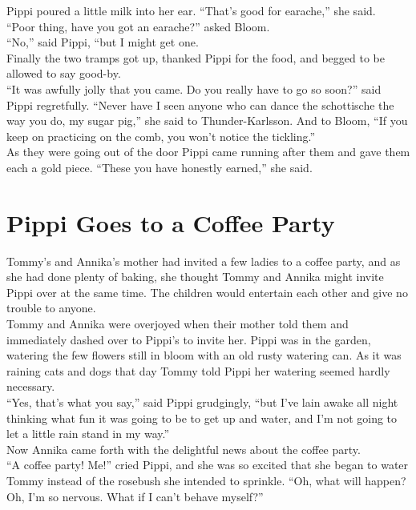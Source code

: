 \documentclass{standard}
\begin{document}
Pippi poured a little milk into her ear. “That’s good for earache,” she said.\\

“Poor thing, have you got an earache?” asked Bloom.\\

“No,” said Pippi, “but I might get one.\\

Finally the two tramps got up, thanked Pippi for the food, and begged to be allowed to say good-by.\\

“It was awfully jolly that you came. Do you really have to go so soon?” said Pippi regretfully. “Never have I seen anyone who can dance the schottische the way you do, my sugar pig,” she said to Thunder-Karlsson. And to Bloom, “If you keep on practicing on the comb, you won’t notice the tickling.”\\

As they were going out of the door Pippi came running after them and gave them each a gold piece. “These you have honestly earned,” she said.
\newpage



\section{Pippi Goes to a Coffee Party}
Tommy’s and Annika’s mother had invited a few ladies to a coffee party, and as she had done plenty of baking, she thought Tommy and Annika might invite Pippi over at the same time. The children would entertain each other and give no trouble to anyone.\\

Tommy and Annika were overjoyed when their mother told them and immediately dashed over to Pippi’s to invite her. Pippi was in the garden, watering the few flowers still in bloom with an old rusty watering can. As it was raining cats and dogs that day Tommy told Pippi her watering seemed hardly necessary.\\

“Yes, that’s what you say,” said Pippi grudgingly, “but I’ve lain awake all night thinking what fun it was going to be to get up and water, and I’m not going to let a little rain stand in my way.”\\

Now Annika came forth with the delightful news about the coffee party.\\

“A coffee party! Me!” cried Pippi, and she was so excited that she began to water Tommy instead of the rosebush she intended to sprinkle. “Oh, what will happen? Oh, I’m so nervous. What if I can’t behave myself?”\\
\end{document}
